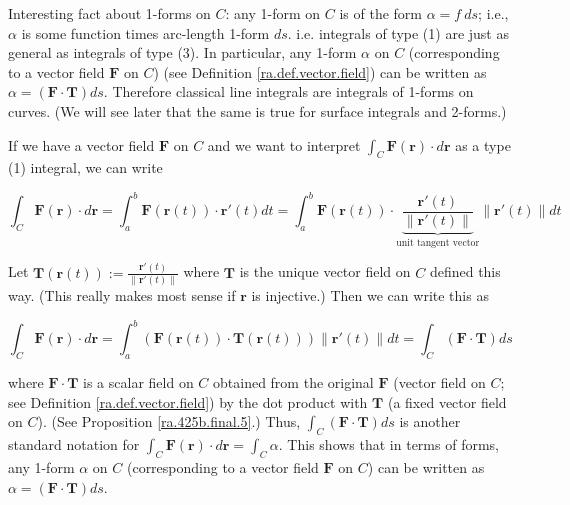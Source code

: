 \begin{remark}

Interesting fact about 1-forms on \(C\): any 1-form on \(C\) is of the form \(\alpha = f \ ds\); i.e., \(\alpha\) is some function times arc-length 1-form \(ds\). i.e. integrals of type (1) are just as general as integrals of type (3). In particular, any 1-form \(\alpha\) on \(C\) (corresponding to a vector field \(\boldsymbol{F}\) on \(C\)) (see Definition \ref{ra.def.vector.field}) can be written as \(\alpha = (\boldsymbol{F} \cdot \boldsymbol{T}) ds\). Therefore classical line integrals are integrals of 1-forms on curves. (We will see later that the same is true for surface integrals and 2-forms.)

If we have a vector field \(\boldsymbol{F}\) on \(C\) and we want to interpret \(\int_C \boldsymbol{F}(\boldsymbol{r}) \cdot d \boldsymbol{r}\) as a type (1) integral, we can write 

\[
\int_C \boldsymbol{F}(\boldsymbol{r}) \cdot d \boldsymbol{r} = \int_a^b \boldsymbol{F}(\boldsymbol{r}(t)) \cdot \boldsymbol{r}'(t) dt = \int_a^b \boldsymbol{F}(\boldsymbol{r}(t)) \cdot  \underbrace{\frac{ \boldsymbol{r}'(t)}{\lVert  \boldsymbol{r}'(t) \rVert}}_{\text{unit tangent vector}}  \lVert \boldsymbol{r}'(t) \rVert dt
\]

Let \(\boldsymbol{T}(\boldsymbol{r}(t)) := \frac{ \boldsymbol{r}'(t)}{\lVert  \boldsymbol{r}'(t) \rVert}\) where \(\boldsymbol{T}\) is the unique vector field on \(C\) defined this way. (This really makes most sense if \(\boldsymbol{r}\) is injective.) Then we can write this as

\[
\int_C \boldsymbol{F}(\boldsymbol{r}) \cdot d \boldsymbol{r}  = \int_a^b \left( \boldsymbol{F}(\boldsymbol{r}(t)) \cdot \boldsymbol{T}(\boldsymbol{r}(t)) \right) \lVert \boldsymbol{r}'(t) \rVert dt = \int_C (\boldsymbol{F} \cdot \boldsymbol{T}) ds
\]

where \(\boldsymbol{F} \cdot \boldsymbol{T}\) is a scalar field on \(C\) obtained from the original \(\boldsymbol{F}\) (vector field on \(C\); see Definition \ref{ra.def.vector.field}) by the dot product with \(\boldsymbol{T}\) (a fixed vector field on \(C\)). (See Proposition \ref{ra.425b.final.5}.) Thus, \(\int_C (\boldsymbol{F} \cdot \boldsymbol{T}) ds\) is another standard notation for \(\int_C \boldsymbol{F}(\boldsymbol{r}) \cdot d \boldsymbol{r} = \int_C \alpha\). This shows that in terms of forms, any 1-form \(\alpha\) on \(C\) (corresponding to a vector field \(\boldsymbol{F}\) on \(C\)) can be written as \(\alpha = (\boldsymbol{F} \cdot \boldsymbol{T}) ds\).

\end{remark}


